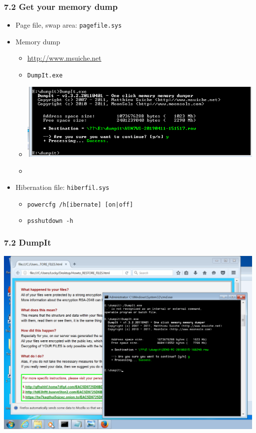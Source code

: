 \begin{frame}
  \frametitle{7.2 Get your memory dump}
    \begin{itemize}
        \item Page file, swap area: \texttt{pagefile.sys}
        \item Memory dump
            \begin{itemize}
		    \item[] \url{http://www.msuiche.net}
		    \item[] \texttt{DumpIt.exe}
                    \item[] \includegraphics[scale=0.5]{images/f12_dumpit.png}
		    \item[] 
            \end{itemize}
        \item Hibernation file: \texttt{hiberfil.sys}
            \begin{itemize}
		    \item[] \texttt{powercfg /h[ibernate] [on|off]}
		    \item[] \texttt{psshutdown -h}
            \end{itemize}
    \end{itemize}
\end{frame}


\begin{frame}
  \frametitle{7.2 DumpIt}
  \includegraphics[scale=0.2]{images/f11_memdump.png}
\end{frame}

